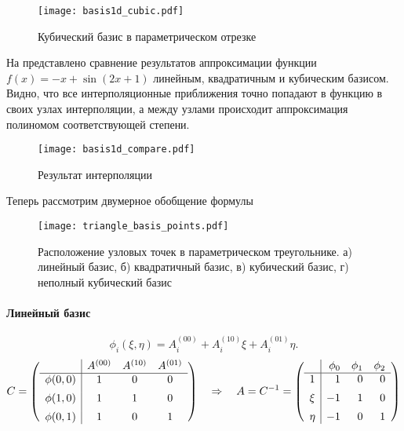 \begin{figure}[h!]
\centering
\texttt{[image: basis1d\_cubic.pdf]}
\caption{Кубический базис в параметрическом отрезке}
\label{fig:basis1d_cubic}
\end{figure}

На  представлено сравнение результатов
аппроксимации функции $f(x) = -x + \sin(2 x + 1)$ линейным, квадратичным и кубическим базисом.
Видно, что все интерполяционные приближения точно попадают в функцию в своих
узлах интерполяции, а между узлами происходит аппроксимация полиномом соответствующей степени.

\begin{figure}[h!]
\centering
\texttt{[image: basis1d\_compare.pdf]}
\caption{Результат интерполяции}
\label{fig:basis1d_compare}
\end{figure}

\label{sec:triangle_bases}
Теперь рассмотрим двумерное обобщение формулы
\begin{figure}[h!]
\centering
\texttt{[image: triangle\_basis\_points.pdf]}
\caption{Расположение узловых точек в параметрическом треугольнике. а) линейный базис, б) квадратичный базис, в) кубический базис, г) неполный кубический базис}
\label{fig:triangle_basis_points}
\end{figure}
\paragraph{Линейный базис}

\begin{equation*}
\phi_i(\xi, \eta) = A_i^{(00)} + A_i^{(10)} \xi + A_i^{(01)} \eta.
\end{equation*}
\begin{equation*}
C = \left(
\begin{array}{l|ccc}
                  & A^{(00)}   & A^{(10)} & A^{(01)} \\
\hline
\phi(0, 0) & 1   & 0   & 0    \\[5pt]
\phi(1, 0) & 1   & 1   & 0    \\[5pt]
\phi(0, 1) & 1   & 0   & 1
\end{array}
\right)
\quad\Rightarrow\quad
A = C^{-1} = 
\left(
\begin{array}{l|rrr}
     & \phi_0 & \phi_1 & \phi_2 \\
\hline
1    & 1      & 0      & 0      \\[5pt]
\xi  &-1      & 1      & 0      \\[5pt]
\eta &-1      & 0      & 1
\end{array}
\right)
\end{equation*}

